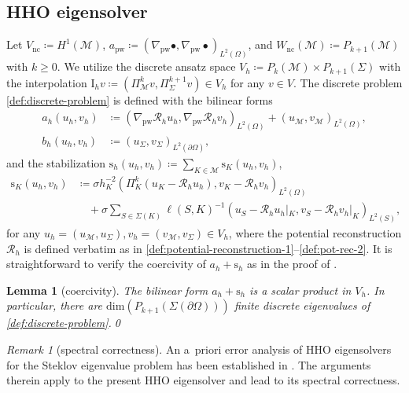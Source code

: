 \documentclass[a4paper]{amsart}
\numberwithin{equation}{section}
\newcommand{\I}{\mathrm{I}}
\newcommand{\Mcal}{\mathcal{M}}
\newcommand{\s}{\mathrm{s}}
\newcommand{\pw}{\mathrm{pw}}
\newtheorem{lemma}[theorem]{Lemma}
\theoremstyle{remark}
\newtheorem{remark}[theorem]{Remark}
\theoremstyle{definition}
\theoremstyle{assumptionnoperiod}
\begin{document}
\subsection{HHO eigensolver}
Let $V_\mathrm{nc} \coloneqq H^1(\Mcal)$, $a_\pw \coloneqq (\nabla_\pw \bullet, \nabla_\pw \bullet)_{L^2(\Omega)}$, and $W_\mathrm{nc}(\Mcal) \coloneqq P_{k+1}(\Mcal)$ with $k \geq 0$.
We utilize the discrete ansatz space $V_h \coloneqq P_k(\Mcal) \times P_{k+1}(\Sigma)$ with the interpolation $\I_h v \coloneqq (\Pi_\Mcal^k v, \Pi_\Sigma^{k+1} v) \in V_h$ for any $v \in V$.
The discrete problem \eqref{def:discrete-problem} is defined with the bilinear forms
\begin{align*}
	a_h (u_h, v_h) &\coloneqq (\nabla_\pw \mathcal{R}_h u_h, \nabla_\pw \mathcal{R}_h v_h)_{L^2(\Omega)} + (u_\Mcal, v_\Mcal)_{L^2(\Omega)},\\
	b_h(u_h,v_h) &\coloneqq (u_\Sigma, v_\Sigma)_{L^2(\partial \Omega)},
\end{align*}
and the stabilization $\s_h(u_h,v_h) \coloneqq \sum_{K \in \mathcal{M}} \s_K(u_h,v_h)$,
\begin{align*}
	\s_K(u_h,v_h) &\coloneqq \sigma h_K^{-2}(\Pi_K^k(u_K - \mathcal{R}_h u_h), v_K - \mathcal{R}_h v_h)_{L^2(\Omega)}\\
	&\quad + \sigma \sum_{S \in \Sigma(K)} \ell(S,K)^{-1}(u_S - \mathcal{R}_h u_h|_K, v_S - \mathcal{R}_h v_h|_K)_{L^2(S)},
\end{align*}
for any $u_h = (u_\Mcal, u_\Sigma), v_h = (v_\Mcal, v_\Sigma) \in V_h$, where the potential reconstruction $\mathcal{R}_h$ is defined verbatim as in \eqref{def:potential-reconstruction-1}--\eqref{def:pot-rec-2}. It is straightforward to verify the coercivity of $a_h + \s_h$ as in the proof of .

\begin{lemma}[coercivity]
	The bilinear form $a_h + \s_h$ is a scalar product in $V_h$.
	In particular, there are $\mathrm{dim}(P_{k+1}(\Sigma(\partial \Omega)))$ finite discrete eigenvalues of \eqref{def:discrete-problem}.\qed
\end{lemma}

\begin{remark}[spectral correctness]
	An a~priori error analysis of HHO eigensolvers for the Steklov eigenvalue problem has been established in \cite{BustinzaCicuttinLombardi2025}. The arguments therein apply to the present HHO eigensolver and lead to its spectral correctness. 
\end{remark}
\end{document}
